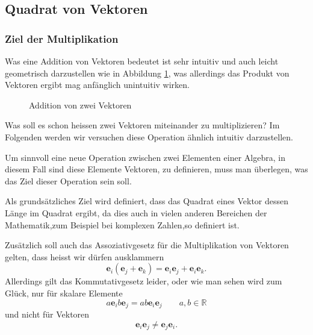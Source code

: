 \subsection{Quadrat von Vektoren}
\subsubsection{Ziel der Multiplikation}
Was eine Addition von Vektoren bedeutet ist sehr intuitiv und auch leicht geometrisch darzustellen wie in Abbildung \ref{figure:addition}, was allerdings das Produkt von Vektoren ergibt mag anfänglich unintuitiv wirken.
\begin{figure}[htb]
	\centering
		\caption{Addition von zwei Vektoren\label{figure:addition}}
\end{figure}
Was soll es schon heissen zwei Vektoren miteinander zu multiplizieren? 
Im Folgenden werden wir versuchen diese Operation ähnlich intuitiv darzustellen.

Um sinnvoll eine neue Operation zwischen zwei Elementen einer Algebra, in diesem Fall sind diese Elemente Vektoren, zu definieren, muss man überlegen, was das Ziel dieser Operation sein soll.
 
Als grundsätzliches Ziel wird definiert, dass das Quadrat eines Vektor dessen Länge im Quadrat ergibt, da dies auch in vielen anderen Bereichen der Mathematik,zum Beispiel bei komplexen Zahlen,so definiert ist.  

Zusätzlich soll auch das Assoziativgesetz für die Multiplikation von Vektoren gelten, dass heisst wir dürfen ausklammern
\begin{equation}
    \label{eq:assoziativ}
    \textbf{e}_i(\textbf{e}_j + \textbf{e}_k) 
    = 
    \textbf{e}_i\textbf{e}_j + \textbf{e}_i\textbf{e}_k.
\end{equation}
Allerdings gilt das Kommutativgesetz leider, oder wie man sehen wird zum Glück, nur für skalare Elemente 
\begin{equation}
    \label{eq:kommSkalar}
    a\textbf{e}_ib\textbf{e}_j 
    = 
    ab\textbf{e}_i\textbf{e}_j \qquad a,b \in \mathbb{R}
\end{equation}
und nicht für Vektoren
\begin{equation}
    \label{eq:kommVector}
    \textbf{e}_i\textbf{e}_j 
    \neq 
    \textbf{e}_j\textbf{e}_i.
\end{equation}
